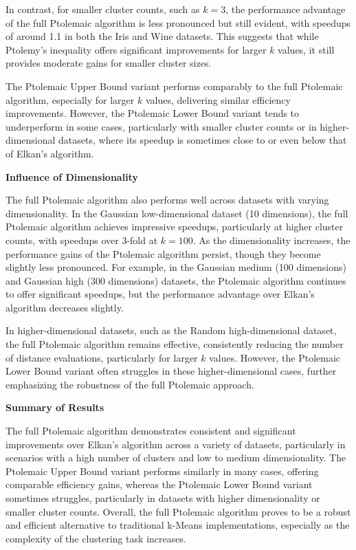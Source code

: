 In contrast, for smaller cluster counts, such as $k = 3$, the performance advantage of the full Ptolemaic algorithm is less pronounced but still evident, with speedups of around 1.1 in both the Iris and Wine datasets. This suggests that while Ptolemy’s inequality offers significant improvements for larger $k$ values, it still provides moderate gains for smaller cluster sizes.

The Ptolemaic Upper Bound variant performs comparably to the full Ptolemaic algorithm, especially for larger $k$ values, delivering similar efficiency improvements. However, the Ptolemaic Lower Bound variant tends to underperform in some cases, particularly with smaller cluster counts or in higher-dimensional datasets, where its speedup is sometimes close to or even below that of Elkan’s algorithm.

\textbf{Influence of Dimensionality}

The full Ptolemaic algorithm also performs well across datasets with varying dimensionality. In the Gaussian low-dimensional dataset (10 dimensions), the full Ptolemaic algorithm achieves impressive speedups, particularly at higher cluster counts, with speedups over 3-fold at $k = 100$. As the dimensionality increases, the performance gains of the Ptolemaic algorithm persist, though they become slightly less pronounced. For example, in the Gaussian medium (100 dimensions) and Gaussian high (300 dimensions) datasets, the Ptolemaic algorithm continues to offer significant speedups, but the performance advantage over Elkan’s algorithm decreases slightly.

In higher-dimensional datasets, such as the Random high-dimensional dataset, the full Ptolemaic algorithm remains effective, consistently reducing the number of distance evaluations, particularly for larger $k$ values. However, the Ptolemaic Lower Bound variant often struggles in these higher-dimensional cases, further emphasizing the robustness of the full Ptolemaic approach.

\textbf{Summary of Results}

The full Ptolemaic algorithm demonstrates consistent and significant improvements over Elkan’s algorithm across a variety of datasets, particularly in scenarios with a high number of clusters and low to medium dimensionality. The Ptolemaic Upper Bound variant performs similarly in many cases, offering comparable efficiency gains, whereas the Ptolemaic Lower Bound variant sometimes struggles, particularly in datasets with higher dimensionality or smaller cluster counts. Overall, the full Ptolemaic algorithm proves to be a robust and efficient alternative to traditional k-Means implementations, especially as the complexity of the clustering task increases.
